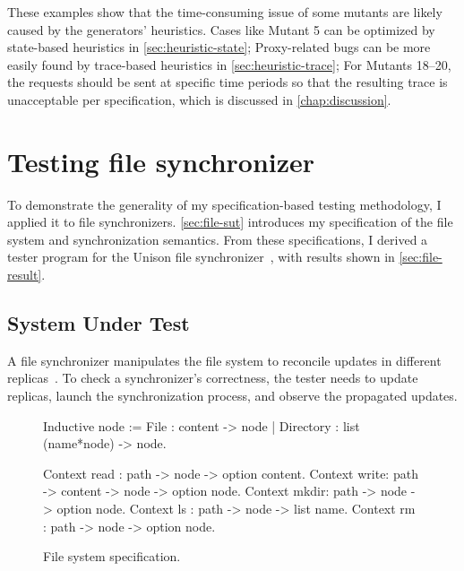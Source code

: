 These examples show that the time-consuming issue of some mutants are likely
caused by the generators' heuristics.  Cases like Mutant 5 can be optimized by
state-based heuristics in \autoref{sec:heuristic-state}; Proxy-related bugs can
be more easily found by trace-based heuristics in \autoref{sec:heuristic-trace};
For Mutants 18--20, the requests should be sent at specific time periods so that
the resulting trace is unacceptable per specification, which is discussed in
\autoref{chap:discussion}.

\section{Testing file synchronizer}
\label{sec:sync}

To demonstrate the generality of my specification-based testing methodology, I
applied it to file synchronizers.  \autoref{sec:file-sut} introduces my
specification of the file system and synchronization semantics.  From these
specifications, I derived a tester program for the Unison file
synchronizer~\cite{unison}, with results shown in \autoref{sec:file-result}.

\subsection{System Under Test}
\label{sec:file-sut}
A file synchronizer manipulates the file system to reconcile updates in
different replicas~\cite{what-sync}.  To check a synchronizer's correctness, the
tester needs to update replicas, launch the synchronization process, and observe
the propagated updates.

\begin{figure}
\begin{coq}
  Inductive node :=
    File      : content          -> node
  | Directory : list (name*node) -> node.

  Context read : path -> node    -> option content.
  Context write: path -> content -> node -> option node.
  Context mkdir: path -> node    -> option node.
  Context ls   : path -> node    -> list name.
  Context rm   : path -> node    -> option node.
\end{coq}
\caption{File system specification.}
\label{fig:file-spec}
\end{figure}

